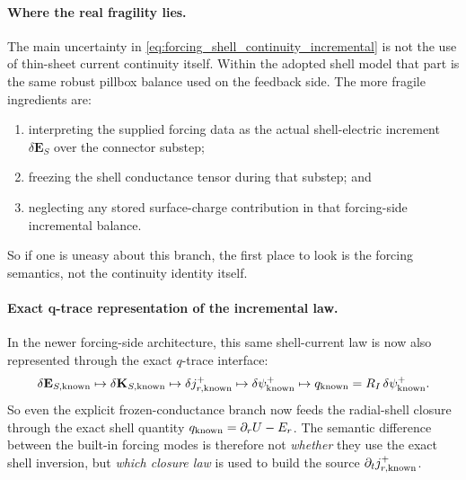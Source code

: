 \documentclass[11pt,a4paper]{article}
\begin{document}
\paragraph{Where the real fragility lies.}
The main uncertainty in \eqref{eq:forcing_shell_continuity_incremental} is not
the use of thin-sheet current continuity itself. Within the adopted shell model
that part is the same robust pillbox balance used on the feedback side. The
more fragile ingredients are:
\begin{enumerate}
\item interpreting the supplied forcing data as the actual shell-electric
increment \(\delta\mathbf E_S\) over the connector substep;
\item freezing the shell conductance tensor during that substep; and
\item neglecting any stored surface-charge contribution in that forcing-side
incremental balance.
\end{enumerate}
So if one is uneasy about this branch, the first place to look is the forcing
semantics, not the continuity identity itself.

\paragraph{Exact q-trace representation of the incremental law.}
In the newer forcing-side architecture, this same shell-current law is now also
represented through the exact \(q\)-trace interface:
\[
\delta \mathbf E_{S,\rm known}
\mapsto
\delta \mathbf K_{S,\rm known}
\mapsto
\delta j_{r,\rm known}^+
\mapsto
\delta\psi_{\rm known}^+
\mapsto
q_{\rm known}=R_I\,\delta\psi_{\rm known}^+.
\]
So even the explicit frozen-conductance branch now feeds the radial-shell
closure through the exact shell quantity \(q_{\rm known}=\partial_rU-E_r\).
The semantic difference between the built-in forcing modes is therefore not
\emph{whether} they use the exact shell inversion, but \emph{which closure law}
is used to build the source \(\partial_t j_{r,\rm known}^+\).
\end{document}
